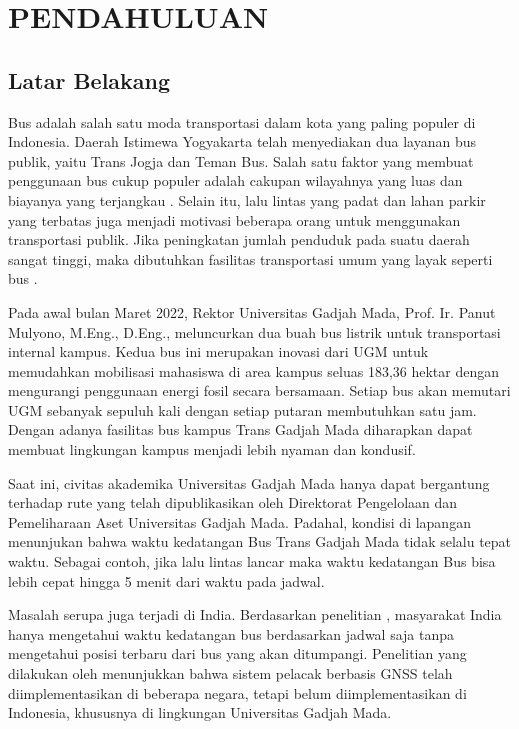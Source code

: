 \chapter{PENDAHULUAN}

\section{Latar Belakang}
Bus adalah salah satu moda transportasi dalam kota yang paling populer di Indonesia. Daerah Istimewa Yogyakarta telah menyediakan dua layanan bus publik, yaitu Trans Jogja dan Teman Bus. Salah satu faktor yang membuat penggunaan bus cukup populer adalah cakupan wilayahnya yang luas dan biayanya yang terjangkau \cite{Rohani2013}. Selain itu, lalu lintas yang padat dan lahan parkir yang terbatas juga menjadi motivasi beberapa orang untuk menggunakan transportasi publik. Jika peningkatan jumlah penduduk pada suatu daerah sangat tinggi, maka dibutuhkan fasilitas transportasi umum yang layak seperti bus \cite{Sutandi2015}.

Pada awal bulan Maret 2022, Rektor Universitas Gadjah Mada, Prof. Ir. Panut Mulyono, M.Eng., D.Eng., meluncurkan dua buah bus listrik untuk transportasi internal kampus. Kedua bus ini merupakan inovasi dari UGM untuk memudahkan mobilisasi mahasiswa di area kampus seluas 183,36 hektar dengan mengurangi penggunaan energi fosil secara bersamaan. Setiap bus akan memutari UGM sebanyak sepuluh kali dengan setiap putaran membutuhkan satu jam. Dengan adanya fasilitas bus kampus Trans Gadjah Mada diharapkan dapat membuat lingkungan kampus menjadi lebih nyaman dan kondusif.

Saat ini, civitas akademika Universitas Gadjah Mada hanya dapat bergantung terhadap rute yang telah dipublikasikan oleh Direktorat Pengelolaan dan Pemeliharaan Aset Universitas Gadjah Mada. Padahal, kondisi di lapangan menunjukan bahwa waktu kedatangan Bus Trans Gadjah Mada tidak selalu tepat waktu. Sebagai contoh, jika lalu lintas lancar maka waktu kedatangan Bus bisa lebih cepat hingga 5 menit dari waktu pada jadwal. 

Masalah serupa juga terjadi di India. Berdasarkan penelitian \cite{Sutar2016}, masyarakat India hanya mengetahui waktu kedatangan bus berdasarkan jadwal saja tanpa mengetahui posisi terbaru dari bus yang akan ditumpangi. Penelitian yang dilakukan oleh \cite{Sneha2014} menunjukkan bahwa sistem pelacak berbasis GNSS telah diimplementasikan di beberapa negara, tetapi belum diimplementasikan di Indonesia, khususnya di lingkungan Universitas Gadjah Mada.


